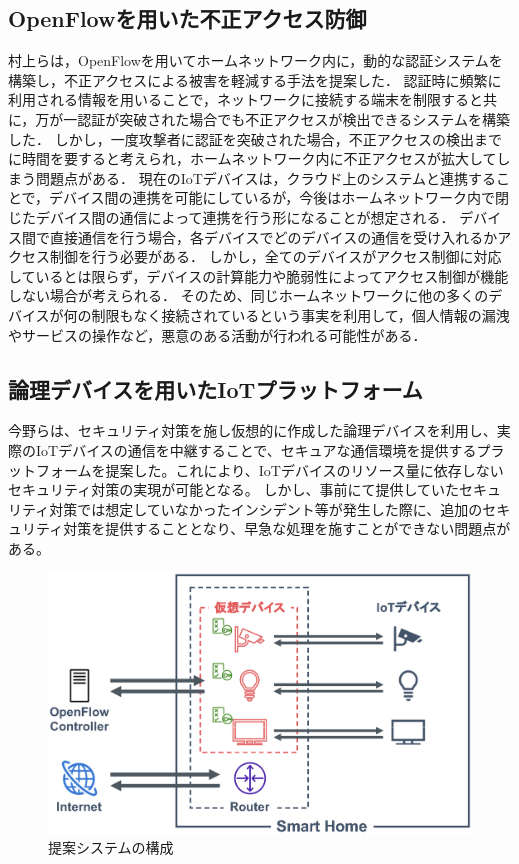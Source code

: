 \documentclass[a4paper,10pt,twocolumn,uplatex]{jsarticle}
\begin{document}
\subsection{OpenFlowを用いた不正アクセス防御}
村上らは，OpenFlowを用いてホームネットワーク内に，動的な認証システムを構築し，不正アクセスによる被害を軽減する手法を提案した\cite{related}．
認証時に頻繁に利用される情報を用いることで，ネットワークに接続する端末を制限すると共に，万が一認証が突破された場合でも不正アクセスが検出できるシステムを構築した．
しかし，一度攻撃者に認証を突破された場合，不正アクセスの検出までに時間を要すると考えられ，ホームネットワーク内に不正アクセスが拡大してしまう問題点がある．
現在のIoTデバイスは，クラウド上のシステムと連携することで，デバイス間の連携を可能にしているが，今後はホームネットワーク内で閉じたデバイス間の通信によって連携を行う形になることが想定される\cite{d2d}．
デバイス間で直接通信を行う場合，各デバイスでどのデバイスの通信を受け入れるかアクセス制御を行う必要がある．
しかし，全てのデバイスがアクセス制御に対応しているとは限らず，デバイスの計算能力や脆弱性によってアクセス制御が機能しない場合が考えられる．
そのため、同じホームネットワークに他の多くのデバイスが何の制限もなく接続されているという事実を利用して，個人情報の漏洩やサービスの操作など，悪意のある活動が行われる可能性がある\cite{disap}．

\subsection{論理デバイスを用いたIoTプラットフォーム}
今野らは、セキュリティ対策を施し仮想的に作成した論理デバイスを利用し、実際のIoTデバイスの通信を中継することで、セキュアな通信環境を提供するプラットフォームを提案した。これにより、IoTデバイスのリソース量に依存しないセキュリティ対策の実現が可能となる。
しかし、事前にて提供していたセキュリティ対策では想定していなかったインシデント等が発生した際に、追加のセキュリティ対策を提供することとなり、早急な処理を施すことができない問題点がある。

\begin{figure}[!tb]
  \centering
  \includegraphics[width=\linewidth]{img/architecture.eps}
  \caption{提案システムの構成}
  \label{fig:architecture}
\end{figure}
\end{document}
